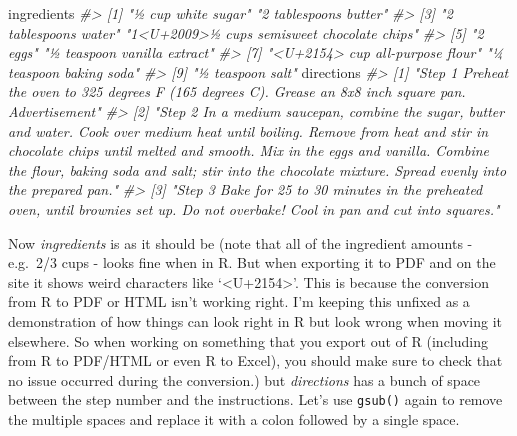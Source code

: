 \documentclass[
  12pt,
]{book}
\newenvironment{Shaded}{\begin{snugshade}}{\end{snugshade}}
\newcommand{\CommentTok}[1]{\textcolor[rgb]{0.37,0.37,0.37}{\textit{#1}}}
\newcommand{\NormalTok}[1]{#1}
\begin{document}
\begin{Shaded}
\begin{Highlighting}[]
\NormalTok{ingredients}
\CommentTok{\#\textgreater{} [1] "½ cup white sugar"                  "2 tablespoons butter"              }
\CommentTok{\#\textgreater{} [3] "2 tablespoons water"                "1\textless{}U+2009\textgreater{}½ cups semisweet chocolate chips"}
\CommentTok{\#\textgreater{} [5] "2  eggs"                            "½ teaspoon vanilla extract"        }
\CommentTok{\#\textgreater{} [7] "\textless{}U+2154\textgreater{} cup all{-}purpose flour"     "¼ teaspoon baking soda"            }
\CommentTok{\#\textgreater{} [9] "½ teaspoon salt"}
\NormalTok{directions}
\CommentTok{\#\textgreater{} [1] "Step 1                                                                                                                                                                                                                  Preheat the oven to 325 degrees F (165 degrees C). Grease an 8x8 inch square pan.                                                                                                                                                                                                                                                          Advertisement"}
\CommentTok{\#\textgreater{} [2] "Step 2                                                                                                                                                                                                                  In a medium saucepan, combine the sugar, butter and water. Cook over medium heat until boiling. Remove from heat and stir in chocolate chips until melted and smooth. Mix in the eggs and vanilla. Combine the flour, baking soda and salt; stir into the chocolate mixture. Spread evenly into the prepared pan."                                       }
\CommentTok{\#\textgreater{} [3] "Step 3                                                                                                                                                                                                                  Bake for 25 to 30 minutes in the preheated oven, until brownies set up. Do not overbake! Cool in pan and cut into squares."}
\end{Highlighting}
\end{Shaded}

Now \emph{ingredients} is as it should be (note that all of the ingredient amounts - e.g.~2/3 cups - looks fine when in R. But when exporting it to PDF and on the site it shows weird characters like `\textless U+2154\textgreater{}'. This is because the conversion from R to PDF or HTML isn't working right. I'm keeping this unfixed as a demonstration of how things can look right in R but look wrong when moving it elsewhere. So when working on something that you export out of R (including from R to PDF/HTML or even R to Excel), you should make sure to check that no issue occurred during the conversion.) but \emph{directions} has a bunch of space between the step number and the instructions. Let's use \texttt{gsub()} again to remove the multiple spaces and replace it with a colon followed by a single space.
\end{document}
